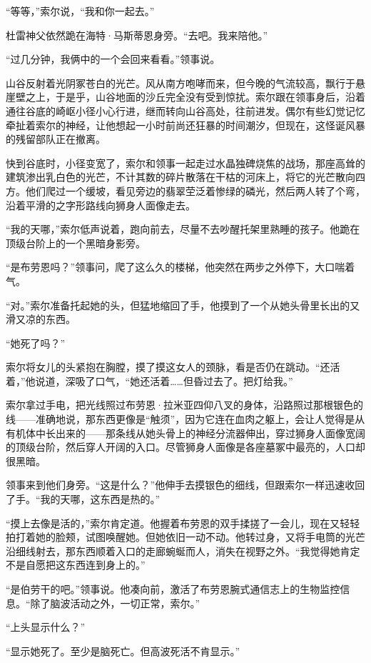 \documentclass[AutoFakeBold=true]{book}
\begin{document}
``等等，''索尔说，``我和你一起去。''

杜雷神父依然跪在海特·马斯蒂恩身旁。``去吧。我来陪他。''

``过几分钟，我俩中的一个会回来看看。''领事说。

山谷反射着光阴冢苍白的光芒。风从南方咆哮而来，但今晚的气流较高，飘行于悬崖壁之上，于是乎，山谷地面的沙丘完全没有受到惊扰。索尔跟在领事身后，沿着通往谷底的崎岖小径小心行进，继而转向山谷高处，往前进发。偶尔有些{\kaishu 幻觉记忆}牵扯着索尔的神经，让他想起一小时前尚还狂暴的时间潮汐，但现在，这怪诞风暴的残留部队正在撤离。

快到谷底时，小径变宽了，索尔和领事一起走过水晶独碑烧焦的战场，那座高耸的建筑渗出乳白色的光芒，不计其数的碎片散落在干枯的河床上，将它的光芒散向四方。他们爬过一个缓坡，看见旁边的翡翠茔泛着惨绿的磷光，然后两人转了个弯，沿着平滑的之字形路线向狮身人面像走去。

``我的天哪，''索尔低声说着，跑向前去，尽量不去吵醒托架里熟睡的孩子。他跪在顶级台阶上的一个黑暗身影旁。

``是布劳恩吗？''领事问，爬了这么久的楼梯，他突然在两步之外停下，大口喘着气。

``对。''索尔准备托起她的头，但猛地缩回了手，他摸到了一个从她头骨里长出的又滑又凉的东西。

``她死了吗？''

索尔将女儿的头紧抱在胸膛，摸了摸这女人的颈脉，看是否仍在跳动。``还活着，''他说道，深吸了口气，``她还活着……但昏过去了。把灯给我。''

索尔拿过手电，把光线照过布劳恩·拉米亚四仰八叉的身体，沿路照过那根银色的线——准确地说，那东西更像是``触须''，因为它连在血肉之躯上，会让人觉得是从有机体中长出来的——那条线从她头骨上的神经分流器伸出，穿过狮身人面像宽阔的顶级台阶，然后穿人开阔的入口。尽管狮身人面像是各座墓冢中最亮的，人口却很黑暗。

领事来到他们身旁。``这是什么？''他伸手去摸银色的细线，但跟索尔一样迅速收回了手。``我的天哪，这东西是热的。''

``摸上去像是活的，''索尔肯定道。他握着布劳恩的双手揉搓了一会儿，现在又轻轻拍打着她的脸颊，试图唤醒她。但她依旧一动不动。他转过身，又将手电筒的光芒沿细线射去，那东西顺着入口的走廊蜿蜒而人，消失在视野之外。``我觉得她肯定不是自愿把这东西连到身上的。''

``是伯劳干的吧。''领事说。他凑向前，激活了布劳恩腕式通信志上的生物监控信息。``除了脑波活动之外，一切正常，索尔。''

``上头显示什么？''

``显示她死了。至少是脑死亡。但高波死活不肯显示。''
\end{document}
